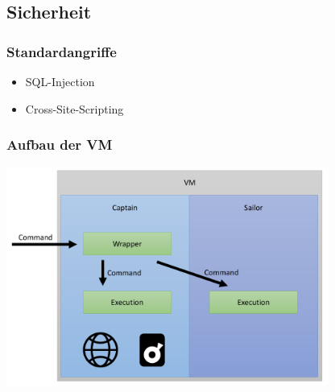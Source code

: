 \subsection{Sicherheit}

\begin{frame}
\frametitle{Standardangriffe}
\begin{itemize}
\item[] SQL-Injection
\item[] Cross-Site-Scripting
\end{itemize}
\end{frame}

\begin{frame}
\frametitle{Aufbau der VM}
\includegraphics[width=300pt]{security/user.pdf}
\end{frame}